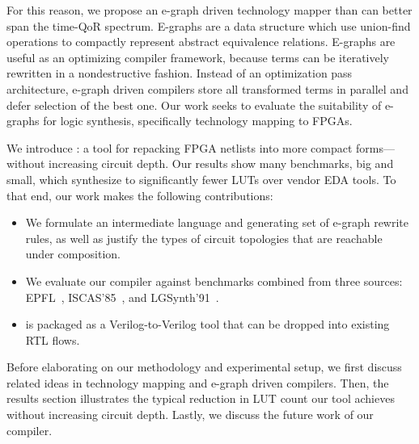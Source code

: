 For this reason, we propose an e-graph driven technology mapper than can better
span the time-QoR spectrum. E-graphs are a data structure which use union-find
operations to compactly represent abstract equivalence relations. E-graphs are
useful as an optimizing compiler framework, because terms can be iteratively
rewritten in a nondestructive fashion. Instead of an optimization pass
architecture, e-graph driven compilers store all transformed terms in parallel
and defer selection of the best one. Our work seeks to evaluate the suitability
of e-graphs for logic synthesis, specifically technology mapping to FPGAs.

We introduce \shortname{}: a tool for repacking FPGA netlists into more compact
forms---without increasing circuit depth. Our results show many benchmarks, big
and small, which synthesize to significantly fewer LUTs over vendor EDA tools.
To that end, our work makes the following contributions:

\begin{itemize}
    \item We formulate an intermediate language and generating set of e-graph rewrite
          rules, as well as justify the types of circuit topologies that are reachable
          under composition.
    \item We evaluate our compiler against \nbenchmarks{} benchmarks combined from three
          sources: EPFL~\cite{epflbench}, ISCAS'85~\cite{iscasbench}, and
          LGSynth'91~\cite{lgsynthbench}.
    \item \shortname{} is packaged as a Verilog-to-Verilog tool that can be dropped into existing RTL flows.
\end{itemize}

Before elaborating on our methodology and experimental setup, we first discuss
related ideas in technology mapping and e-graph driven compilers. Then, the
results section illustrates the typical reduction in LUT count our tool
achieves without increasing circuit depth. Lastly, we discuss the future work
of our compiler.